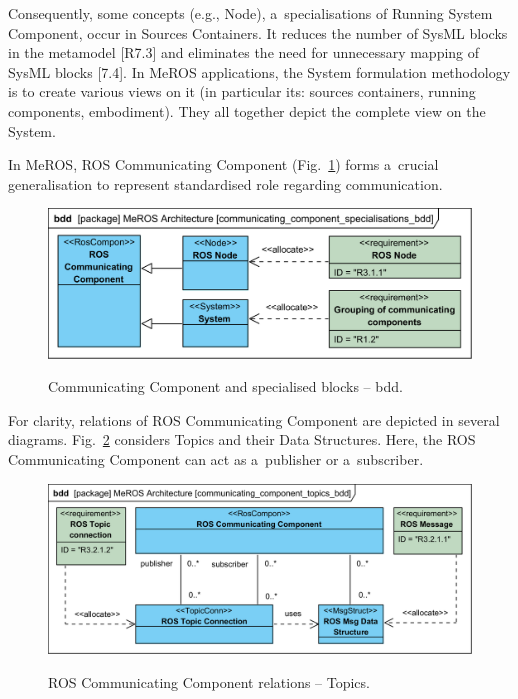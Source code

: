 \documentclass[11pt,oneside,a4paper]{report}
\begin{document}
	Consequently, some concepts (e.g., Node), a~specialisations of Running System Component, occur in Sources Containers. It reduces the number of SysML blocks in the metamodel [R7.3] and eliminates the need for unnecessary mapping of SysML blocks [7.4]. In MeROS applications, the System formulation methodology is to create various views on it (in particular its: sources containers, running components, embodiment). They all together depict the complete view on the System.
	
	In MeROS, ROS Communicating Component (Fig.~\ref{fig:communicating_components_bdd}) forms a~crucial generalisation to represent standardised role regarding communication. 
	
		
	\begin{figure}[H]
		\centering
		\begin{center}
			{\includegraphics[scale=1.0]{diagrams/communicating_component_specialisations_bdd.png}}
		\end{center}
		\caption{Communicating Component and specialised blocks -- bdd.} 
		\label{fig:communicating_components_bdd}
	\end{figure}
	
	For clarity, relations of ROS Communicating Component are depicted in several diagrams. Fig.~\ref{fig:communicating_component_topics_bdd} considers Topics and their Data Structures. Here, the ROS Communicating Component can act as a~publisher or a~subscriber.	
	 
	
	\begin{figure}[H]
		\centering
		\begin{center}
			{\includegraphics[scale=1.0]{diagrams/communicating_component_topics_bdd.png}}
		\end{center}
		\caption{ROS Communicating Component relations -- Topics.} 
		\label{fig:communicating_component_topics_bdd}
	\end{figure}
	
\end{document}
